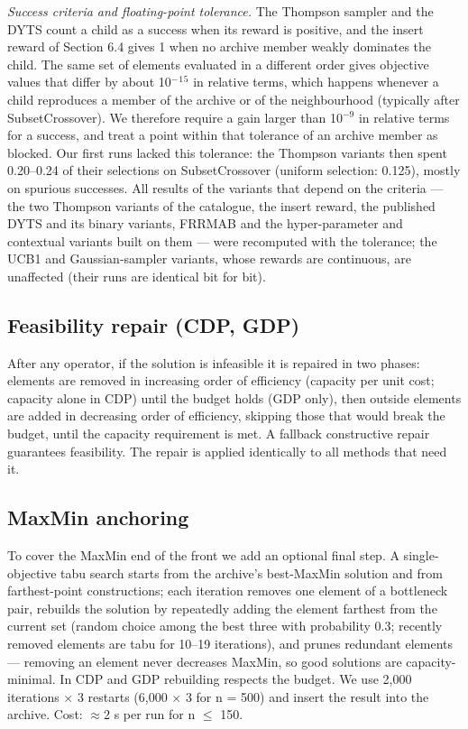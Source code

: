 \emph{Success criteria and floating-point tolerance.} The Thompson sampler and the DYTS count a child as a success when its reward is positive, and the insert reward of Section 6.4 gives 1 when no archive member weakly dominates the child. The same set of elements evaluated in a different order gives objective values that differ by about 10$^{-}$$^{1}$$^{5}$ in relative terms, which happens whenever a child reproduces a member of the archive or of the neighbourhood (typically after SubsetCrossover). We therefore require a gain larger than 10$^{-9}$ in relative terms for a success, and treat a point within that tolerance of an archive member as blocked. Our first runs lacked this tolerance: the Thompson variants then spent 0.20--0.24 of their selections on SubsetCrossover (uniform selection: 0.125), mostly on spurious successes. All results of the variants that depend on the criteria --- the two Thompson variants of the catalogue, the insert reward, the published DYTS and its binary variants, FRRMAB and the hyper-parameter and contextual variants built on them --- were recomputed with the tolerance; the UCB1 and Gaussian-sampler variants, whose rewards are continuous, are unaffected (their runs are identical bit for bit).

\subsection{Feasibility repair (CDP, GDP)}\label{sec:feasibility_repair_cdp_gdp}

After any operator, if the solution is infeasible it is repaired in two phases: elements are removed in increasing order of efficiency (capacity per unit cost; capacity alone in CDP) until the budget holds (GDP only), then outside elements are added in decreasing order of efficiency, skipping those that would break the budget, until the capacity requirement is met. A fallback constructive repair guarantees feasibility. The repair is applied identically to all methods that need it.

\subsection{MaxMin anchoring}\label{sec:anchor}

To cover the MaxMin end of the front we add an optional final step. A single-objective tabu search starts from the archive's best-MaxMin solution and from farthest-point constructions; each iteration removes one element of a bottleneck pair, rebuilds the solution by repeatedly adding the element farthest from the current set (random choice among the best three with probability 0.3; recently removed elements are tabu for 10--19 iterations), and prunes redundant elements --- removing an element never decreases MaxMin, so good solutions are capacity-minimal. In CDP and GDP rebuilding respects the budget. We use 2,000 iterations $\times$ 3 restarts (6,000 $\times$ 3 for n = 500) and insert the result into the archive. Cost: $\approx$2 s per run for n $\leq$ 150.

